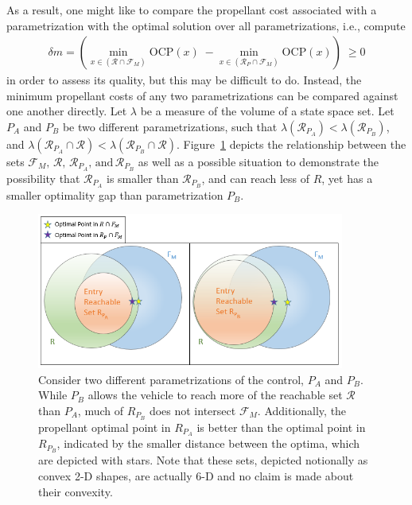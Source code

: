 \documentclass[letterpaper, paper,11pt]{AAS}
\begin{document}
As a result, one might like to compare the propellant cost associated with a parametrization with the optimal solution over all parametrizations, i.e., compute
\begin{align}
\delta m = \left( \min_{x\in (\mathcal{R}\cap \mathcal{F}_M)} \mathrm{OCP}(x)\; - \min_{x\in (\mathcal{R}_P\cap \mathcal{F}_M)} \mathrm{OCP}(x) \right) \; \ge 0
\end{align}
in order to assess its quality, but this may be difficult to do. Instead, the minimum propellant costs of any two parametrizations can be compared against one another directly.  Let $\lambda$ be a measure of the volume of a state space set. Let $ P_A $ and  $ P_B $ be two different parametrizations, such that $\lambda(\mathcal{R}_{P_A}) < \lambda(\mathcal{R}_{P_B})$, and $\lambda(\mathcal{R}_{P_A}\cap \mathcal{R}) < \lambda(\mathcal{R}_{P_B}\cap \mathcal{R})$.
Figure~\ref{fig_sets} depicts the relationship between the sets $\mathcal{F}_M,\,\mathcal{R},\,\mathcal{R}_{P_A},\,\mathrm{and}\,\mathcal{R}_{P_B}$ as well as a possible situation to demonstrate the possibility that $ \mathcal{R}_{P_A} $ is smaller than $\mathcal{R}_{P_B}$, and can reach less of $R$, yet has a smaller optimality gap than parametrization $ P_B $. 
\begin{figure}[h!]
	\centering
	\includegraphics[width=0.9\textwidth]{SetDefinitions} 
	\caption{Consider two different parametrizations of the control, $ P_A $ and $ P_B $. While $ P_B $ allows the vehicle to reach more of the reachable set $\mathcal{R} $ than  $P_A$, much of $ R_{P_B}$ does not intersect $\mathcal{F}_M$. Additionally, the propellant optimal point in $ R_{P_A}$ is better than the optimal point in $ R_{P_B}$, indicated by the smaller distance between the optima, which are depicted with stars.  Note that these sets, depicted notionally as convex 2-D shapes, are actually 6-D and no claim is made about their convexity.}
	\label{fig_sets}
\end{figure}
\end{document}
